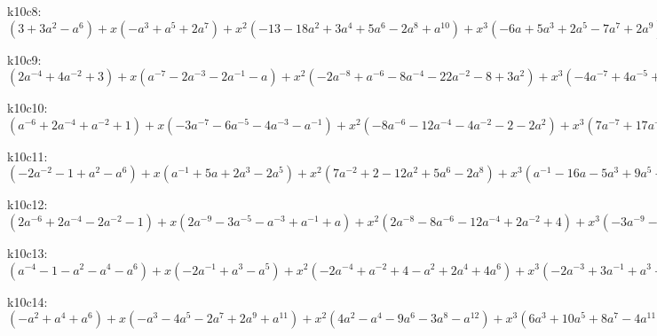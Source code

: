 k10c8: $ (3+3a^{2}-a^{6}) +x(-a^{3}+a^{5}+2a^{7}) +x^{2}(-13-18a^{2}+3a^{4}+5a^{6}-2a^{8}+a^{10}) +x^{3}(-6a+5a^{3}+2a^{5}-7a^{7}+2a^{9}) +x^{4}(16+30a^{2}+a^{4}-10a^{6}+3a^{8}) +x^{5}(11a-a^{3}-8a^{5}+4a^{7}) +x^{6}(-7-17a^{2}-6a^{4}+4a^{6}) +x^{7}(-6a-3a^{3}+3a^{5}) +x^{8}(1+3a^{2}+2a^{4}) +x^{9}(a+a^{3}) $

k10c9: $ (2a^{-4}+4a^{-2}+3) +x(a^{-7}-2a^{-3}-2a^{-1}-a) +x^{2}(-2a^{-8}+a^{-6}-8a^{-4}-22a^{-2}-8+3a^{2}) +x^{3}(-4a^{-7}+4a^{-5}+5a^{-3}+4a^{-1}+7a) +x^{4}(a^{-8}-3a^{-6}+13a^{-4}+31a^{-2}+10-4a^{2}) +x^{5}(2a^{-7}-4a^{-5}-2a^{-1}-8a) +x^{6}(2a^{-6}-7a^{-4}-18a^{-2}-8+a^{2}) +x^{7}(2a^{-5}-2a^{-3}-2a^{-1}+2a) +x^{8}(2a^{-4}+4a^{-2}+2) +x^{9}(a^{-3}+a^{-1}) $

k10c10: $ (a^{-6}+2a^{-4}+a^{-2}+1) +x(-3a^{-7}-6a^{-5}-4a^{-3}-a^{-1}) +x^{2}(-8a^{-6}-12a^{-4}-4a^{-2}-2-2a^{2}) +x^{3}(7a^{-7}+17a^{-5}+17a^{-3}+3a^{-1}-3a+a^{3}) +x^{4}(15a^{-6}+26a^{-4}+5a^{-2}-3+3a^{2}) +x^{5}(-5a^{-7}-10a^{-5}-16a^{-3}-7a^{-1}+4a) +x^{6}(-10a^{-6}-21a^{-4}-7a^{-2}+4) +x^{7}(a^{-7}-a^{-5}+2a^{-3}+4a^{-1}) +x^{8}(2a^{-6}+5a^{-4}+3a^{-2}) +x^{9}(a^{-5}+a^{-3}) $

k10c11: $ (-2a^{-2}-1+a^{2}-a^{6}) +x(a^{-1}+5a+2a^{3}-2a^{5}) +x^{2}(7a^{-2}+2-12a^{2}+5a^{6}-2a^{8}) +x^{3}(a^{-1}-16a-5a^{3}+9a^{5}-3a^{7}) +x^{4}(-5a^{-2}-1+16a^{2}+5a^{4}-6a^{6}+a^{8}) +x^{5}(-3a^{-1}+11a+5a^{3}-7a^{5}+2a^{7}) +x^{6}(a^{-2}-2-10a^{2}-4a^{4}+3a^{6}) +x^{7}(a^{-1}-4a-2a^{3}+3a^{5}) +x^{8}(1+3a^{2}+2a^{4}) +x^{9}(a+a^{3}) $

k10c12: $ (2a^{-6}+2a^{-4}-2a^{-2}-1) +x(2a^{-9}-3a^{-5}-a^{-3}+a^{-1}+a) +x^{2}(2a^{-8}-8a^{-6}-12a^{-4}+2a^{-2}+4) +x^{3}(-3a^{-9}-a^{-7}+4a^{-5}+5a^{-3}-3a) +x^{4}(-5a^{-8}+8a^{-6}+23a^{-4}+4a^{-2}-6) +x^{5}(a^{-9}-3a^{-7}-a^{-3}-4a^{-1}+a) +x^{6}(2a^{-8}-5a^{-6}-14a^{-4}-5a^{-2}+2) +x^{7}(2a^{-7}-a^{-5}-a^{-3}+2a^{-1}) +x^{8}(2a^{-6}+4a^{-4}+2a^{-2}) +x^{9}(a^{-5}+a^{-3}) $

k10c13: $ (a^{-4}-1-a^{2}-a^{4}-a^{6}) +x(-2a^{-1}+a^{3}-a^{5}) +x^{2}(-2a^{-4}+a^{-2}+4-a^{2}+2a^{4}+4a^{6}) +x^{3}(-2a^{-3}+3a^{-1}+a^{3}+6a^{5}) +x^{4}(a^{-4}-3a^{-2}-3+6a^{2}+a^{4}-4a^{6}) +x^{5}(2a^{-3}-3a^{-1}-2a-4a^{3}-7a^{5}) +x^{6}(3a^{-2}-9a^{2}-5a^{4}+a^{6}) +x^{7}(3a^{-1}+a+2a^{5}) +x^{8}(2+4a^{2}+2a^{4}) +x^{9}(a+a^{3}) $

k10c14: $ (-a^{2}+a^{4}+a^{6}) +x(-a^{3}-4a^{5}-2a^{7}+2a^{9}+a^{11}) +x^{2}(4a^{2}-a^{4}-9a^{6}-3a^{8}-a^{12}) +x^{3}(6a^{3}+10a^{5}+8a^{7}-4a^{11}) +x^{4}(-4a^{2}+2a^{4}+16a^{6}+5a^{8}-4a^{10}+a^{12}) +x^{5}(-7a^{3}-9a^{5}-9a^{7}-4a^{9}+3a^{11}) +x^{6}(a^{2}-5a^{4}-14a^{6}-4a^{8}+4a^{10}) +x^{7}(2a^{3}+a^{5}+3a^{7}+4a^{9}) +x^{8}(2a^{4}+5a^{6}+3a^{8}) +x^{9}(a^{5}+a^{7}) $

